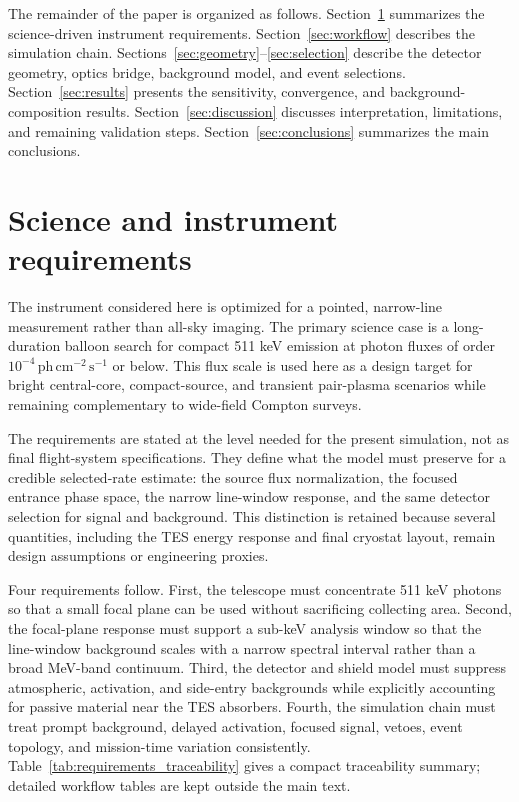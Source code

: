 \documentclass[preprint,12pt]{elsarticle}
\newcommand{\phcms}{\,\mathrm{ph\,cm^{-2}\,s^{-1}}}
\begin{document}
The remainder of the paper is organized as follows. Section~\ref{sec:requirements} summarizes the science-driven instrument requirements. Section~\ref{sec:workflow} describes the simulation chain. Sections~\ref{sec:geometry}--\ref{sec:selection} describe the detector geometry, optics bridge, background model, and event selections. Section~\ref{sec:results} presents the sensitivity, convergence, and background-composition results. Section~\ref{sec:discussion} discusses interpretation, limitations, and remaining validation steps. Section~\ref{sec:conclusions} summarizes the main conclusions.

\section{Science and instrument requirements}
\label{sec:requirements}

The instrument considered here is optimized for a pointed, narrow-line measurement rather than all-sky imaging. The primary science case is a long-duration balloon search for compact 511 keV emission at photon fluxes of order $10^{-4}\phcms$ or below. This flux scale is used here as a design target for bright central-core, compact-source, and transient pair-plasma scenarios while remaining complementary to wide-field Compton surveys.

The requirements are stated at the level needed for the present simulation, not as final flight-system specifications. They define what the model must preserve for a credible selected-rate estimate: the source flux normalization, the focused entrance phase space, the narrow line-window response, and the same detector selection for signal and background. This distinction is retained because several quantities, including the TES energy response and final cryostat layout, remain design assumptions or engineering proxies.

Four requirements follow. First, the telescope must concentrate 511 keV photons so that a small focal plane can be used without sacrificing collecting area. Second, the focal-plane response must support a sub-keV analysis window so that the line-window background scales with a narrow spectral interval rather than a broad MeV-band continuum. Third, the detector and shield model must suppress atmospheric, activation, and side-entry backgrounds while explicitly accounting for passive material near the TES absorbers. Fourth, the simulation chain must treat prompt background, delayed activation, focused signal, vetoes, event topology, and mission-time variation consistently. Table~\ref{tab:requirements_traceability} gives a compact traceability summary; detailed workflow tables are kept outside the main text.
\end{document}
